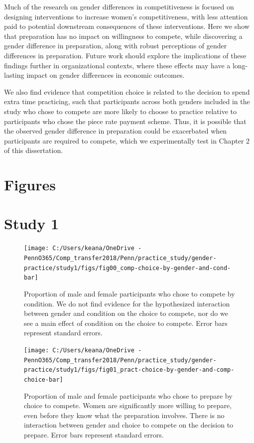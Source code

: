 \documentclass[a4paper, nobind]{templates/ociamthesis}
\begin{document}
Much of the research on gender differences in competitiveness is focused on designing interventions to increase women's competitiveness, with less attention paid to potential downstream consequences of these interventions. Here we show that preparation has no impact on willingness to compete, while discovering a gender difference in preparation, along with robust perceptions of gender differences in preparation. Future work should explore the implications of these findings further in organizational contexts, where these effects may have a long-lasting impact on gender differences in economic outcomes.

We also find evidence that competition choice is related to the decision to spend extra time practicing, such that participants across both genders included in the study who chose to compete are more likely to choose to practice relative to participants who chose the piece rate payment scheme. Thus, it is possible that the observed gender difference in preparation could be exacerbated when participants are required to compete, which we experimentally test in Chapter 2 of this dissertation.

\hypertarget{figures}{%
\section{Figures}\label{figures}}

\hypertarget{study-1-1}{%
\section{Study 1}\label{study-1-1}}

\begin{figure}
\texttt{[image: C:/Users/keana/OneDrive - PennO365/Comp\_transfer2018/Penn/practice\_study/gender-practice/study1/figs/fig00\_comp-choice-by-gender-and-cond-bar]} \caption{Proportion of male and female participants who chose to compete by condition. We do not find evidence for the hypothesized interaction between gender and condition on the choice to compete, nor do we see a main effect of condition on the choice to compete. Error bars represent standard errors.}\label{fig:s100}
\end{figure}

\begin{figure}
\texttt{[image: C:/Users/keana/OneDrive - PennO365/Comp\_transfer2018/Penn/practice\_study/gender-practice/study1/figs/fig01\_pract-choice-by-gender-and-comp-choice-bar]} \caption{Proportion of male and female participants who chose to prepare by choice to compete. Women are significantly more willing to prepare, even before they know what the preparation involves. There is no interaction between gender and choice to compete on the decision to prepare. Error bars represent standard errors.}\label{fig:s101}
\end{figure}
\end{document}
